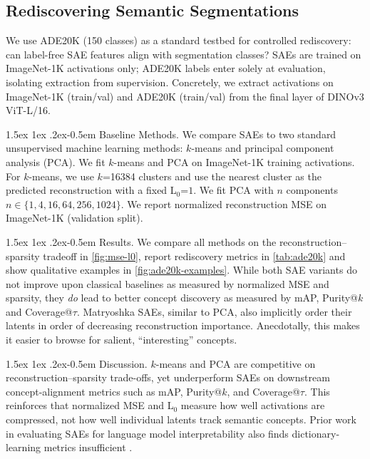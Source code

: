 \documentclass{article}
\makeatletter
\renewcommand{\paragraph}{%
  \@startsection{paragraph}{4}%
  {\z@}{1.5ex \@plus 1ex \@minus .2ex}{-0.5em}%
  {\normalfont\normalsize\bfseries}%
}
\theoremstyle{plain}
\theoremstyle{definition}
\theoremstyle{remark}
\makeatother
\begin{document}
\subsection{Rediscovering Semantic Segmentations}\label{sec:ade20k}

We use ADE20K (150 classes) as a standard testbed for controlled rediscovery: can label-free SAE features align with segmentation classes? 
SAEs are trained on ImageNet-1K activations only; ADE20K labels enter solely at evaluation, isolating extraction from supervision.
Concretely, we extract activations on ImageNet-1K (train/val) and ADE20K (train/val) from the final layer of DINOv3 ViT-L/16. 


\paragraph{Baseline Methods.}
We compare SAEs to two standard unsupervised machine learning methods: $k$-means and principal component analysis (PCA).
We fit $k$-means and PCA on ImageNet-1K training activations.
For $k$-means, we use $k$=\num{16384} clusters and use the nearest cluster as the predicted reconstruction with a fixed L$_0$=$1$.
We fit PCA with $n$ components $n \in \{1,4,16,64,256,1024\}$.
We report normalized reconstruction MSE on ImageNet-1K (validation split).

\paragraph{Results.}
We compare all methods on the reconstruction--sparsity tradeoff in \cref{fig:mse-l0}, report rediscovery metrics in \cref{tab:ade20k} and show qualitative examples in \cref{fig:ade20k-examples}.
While both SAE variants do not improve upon classical baselines as measured by normalized MSE and sparsity, they \textit{do} lead to better concept discovery as measured by mAP, Purity@$k$ and Coverage@$\tau$.
Matryoshka SAEs, similar to PCA, also implicitly order their latents in order of decreasing reconstruction importance. 
Anecdotally, this makes it easier to browse for salient, ``interesting'' concepts.

\paragraph{Discussion.}
$k$-means and PCA are competitive on reconstruction--sparsity trade-offs, yet underperform SAEs on downstream concept-alignment metrics such as mAP, Purity@$k$, and Coverage@$\tau$. 
This reinforces that normalized MSE and L$_0$ measure how well activations are compressed, not how well individual latents track semantic concepts.
Prior work in evaluating SAEs for language model interpretability also finds dictionary-learning metrics insufficient \citep{karvonen2025saebench}.
\end{document}
